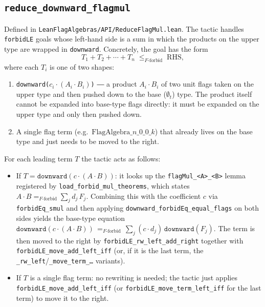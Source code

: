 \documentclass[11pt]{article}
\begin{document}
\subsection{\texttt{reduce\_downward\_flagmul}}

Defined in \texttt{LeanFlagAlgebras/API/ReduceFlagMul.lean}. The
tactic handles \texttt{forbidLE} goals whose left-hand side is a sum
in which the products on the upper type are wrapped in
\texttt{downward}. Concretely, the goal has the form
\[
   T_1 + T_2 + \cdots + T_n \;\le_{F\text{-forbid}}\; \mathrm{RHS},
\]
where each $T_i$ is one of two shapes:
\begin{enumerate}
  \item \texttt{downward(}$c_i \cdot (A_i \cdot B_i)$\texttt{)} ―
    a product $A_i \cdot B_i$ of two unit flags taken on the upper
    type and then pushed down to the base ($\emptyset_t$) type. The
    product itself cannot be expanded into base-type flags directly:
    it must be expanded on the upper type and only then pushed down.
  \item A single flag term (e.g.\ $\mathrm{FlagAlgebra}\_n\_0\_0\_k$)
    that already lives on the base type and just needs to be moved to
    the right.
\end{enumerate}

For each leading term $T$ the tactic acts as follows:

\begin{itemize}
  \item If $T = \texttt{downward}(c \cdot (A \cdot B))$: it looks up the
    \texttt{flagMul\_<A>\_<B>} lemma registered by
    \texttt{load\_forbid\_mul\_theorems}, which states
    $A \cdot B =_{F\text{-forbid}} \sum_j d_j\,F_j$. Combining this
    with the coefficient $c$ via \texttt{forbidEq\_smul} and then
    applying \texttt{downward\_forbidEq\_equal\_flags} on both sides
    yields the base-type equation
    $\texttt{downward}(c \cdot (A \cdot B))
       \,=_{F\text{-forbid}}\, \sum_j (c \cdot d_j)\,\texttt{downward}(F_j)$.
    The term is then moved to the right by
    \texttt{forbidLE\_rw\_left\_add\_right} together with
    \texttt{forbidLE\_move\_add\_left\_iff} (or, if it is the last
    term, the \texttt{\_rw\_left}/\texttt{\_move\_term\_\ldots}
    variants).
  \item If $T$ is a single flag term: no rewriting is needed; the
    tactic just applies
    \texttt{forbidLE\_move\_add\_left\_iff} (or
    \texttt{forbidLE\_move\_term\_left\_iff} for the last term) to
    move it to the right.
\end{itemize}
\end{document}
